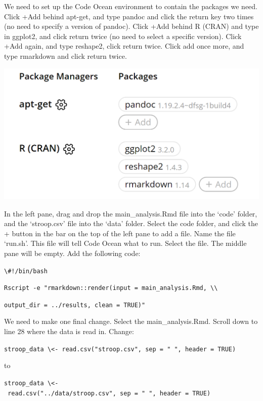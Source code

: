 \documentclass[
  oneside]{krantz}
\begin{document}
We need to set up the Code Ocean environment to contain the packages we need.
Click +Add behind apt-get, and type pandoc and click the return key two times
(no need to specify a version of pandoc). Click +Add behind R (CRAN) and type in
ggplot2, and click return twice (no need to select a specific version). Click
+Add again, and type reshape2, click return twice. Click add once more, and type
rmarkdown and click return twice.

\begin{center}\includegraphics[width=1\linewidth]{images/7be787e67b7e874fa88cfc2daae850b4} \end{center}

In the left pane, drag and drop the main\_analysis.Rmd file into the `code' folder, and the `stroop.csv' file into the `data' folder. Select the code folder, and click the + button in the bar on the top of the left pane to add a
file. Name the file `run.sh'. This file will tell Code Ocean what to run. Select the file. The middle pane will be empty. Add the following code:

\texttt{\textbackslash{}\#!/bin/bash}

\texttt{Rscript\ -e\ "rmarkdown::render(input\ =\ \textquotesingle{}main\_analysis.Rmd\textquotesingle{},\ \textbackslash{}\textbackslash{}}

\texttt{output\_dir\ =\ \textquotesingle{}../results\textquotesingle{},\ clean\ =\ TRUE)"}

We need to make one final change. Select the main\_analysis.Rmd. Scroll down to
line 28 where the data is read in. Change:

\texttt{stroop\_data\ \textbackslash{}\textless{}-\ read.csv("stroop.csv",\ sep\ =\ "\ ",\ header\ =\ TRUE)}

to

\texttt{stroop\_data\ \textbackslash{}\textless{}-\ read.csv("../data/stroop.csv",\ sep\ =\ "\ ",\ header\ =\ TRUE)}
\end{document}
